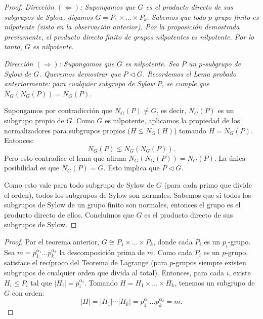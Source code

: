 
\begin{proof}
    \itshape Dirección $(\Leftarrow)$: \normalfont
    Supongamos que $G$ es el producto directo de sus subgrupos de Sylow, digamos $G = P_1 \times \dots \times P_k$.
    Sabemos que todo $p$-grupo finito es nilpotente (visto en la observación anterior).
    Por la proposición demostrada previamente, el producto directo finito de grupos nilpotentes es nilpotente.
    Por lo tanto, $G$ es nilpotente.

    \itshape Dirección $(\Rightarrow)$: \normalfont
    Supongamos que $G$ es nilpotente. Sea $P$ un $p$-subgrupo de Sylow de $G$.
    Queremos demostrar que $P \triangleleft G$.
    Recordemos el Lema probado anteriormente: para cualquier subgrupo de Sylow $P$, se cumple que $N_G(N_G(P)) = N_G(P)$.
    
    Supongamos por contradicción que $N_G(P) \neq G$, es decir, $N_G(P)$ es un subgrupo propio de $G$.
    Como $G$ es nilpotente, aplicamos la propiedad de los normalizadores para subgrupos propios ($H \lneq N_G(H)$) tomando $H = N_G(P)$.
    Entonces:
    \begin{equation*}
        N_G(P) \lneq N_G(N_G(P)).
    \end{equation*}
    Pero esto contradice el lema que afirma $N_G(N_G(P)) = N_G(P)$.
    La única posibilidad es que $N_G(P) = G$.
    Esto implica que $P \triangleleft G$.
    
    Como esto vale para todo subgrupo de Sylow de $G$ (para cada primo que divide el orden), todos los subgrupos de Sylow son normales.
    Sabemos que si todos los subgrupos de Sylow de un grupo finito son normales, entonces el grupo es el producto directo de ellos.
    Concluimos que $G$ es el producto directo de sus subgrupos de Sylow.
\end{proof}


\begin{proof}
    Por el teorema anterior, $G \cong P_1 \times \dots \times P_k$, donde cada $P_i$ es un $p_i$-grupo.
    Sea $m = p_1^{\alpha_1} \dots p_k^{\alpha_k}$ la descomposición prima de $m$.
    Como cada $P_i$ es un $p$-grupo, satisface el recíproco del Teorema de Lagrange (para $p$-grupos siempre existen subgrupos de cualquier orden que divida al total).
    Entonces, para cada $i$, existe $H_i \le P_i$ tal que $|H_i| = p_i^{\alpha_i}$.
    Tomando $H = H_1 \times \dots \times H_k$, tenemos un subgrupo de $G$ con orden:
    \begin{equation*}
        |H| = |H_1| \cdots |H_k| = p_1^{\alpha_1} \dots p_k^{\alpha_k} = m.
    \end{equation*}
\end{proof}

